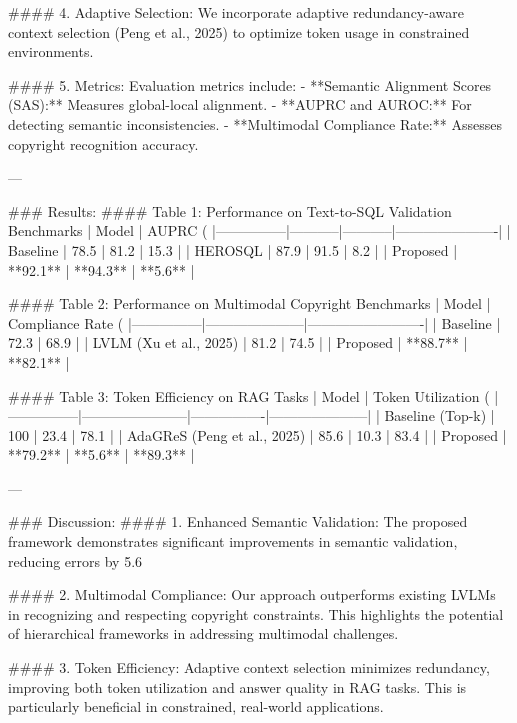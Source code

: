 #### 4. Adaptive Selection:
We incorporate adaptive redundancy-aware context selection (Peng et al., 2025) to optimize token usage in constrained environments.

#### 5. Metrics:
Evaluation metrics include:
- **Semantic Alignment Scores (SAS):** Measures global-local alignment.
- **AUPRC and AUROC:** For detecting semantic inconsistencies.
- **Multimodal Compliance Rate:** Assesses copyright recognition accuracy.

---

### Results:
#### Table 1: Performance on Text-to-SQL Validation Benchmarks
| Model         | AUPRC (%
|---------------|-----------|-----------|----------------------|
| Baseline      | 78.5      | 81.2      | 15.3                 |
| HEROSQL       | 87.9      | 91.5      | 8.2                  |
| Proposed      | **92.1**  | **94.3**  | **5.6**              |

#### Table 2: Performance on Multimodal Copyright Benchmarks
| Model         | Compliance Rate (%
|---------------|---------------------|-------------------------|
| Baseline      | 72.3                | 68.9                    |
| LVLM (Xu et al., 2025) | 81.2        | 74.5                    |
| Proposed      | **88.7**            | **82.1**                |

#### Table 3: Token Efficiency on RAG Tasks
| Model         | Token Utilization (%
|---------------|-----------------------|----------------|---------------------|
| Baseline (Top-k) | 100                | 23.4           | 78.1                |
| AdaGReS (Peng et al., 2025) | 85.6   | 10.3           | 83.4                |
| Proposed      | **79.2**             | **5.6**        | **89.3**            |

---

### Discussion:
#### 1. Enhanced Semantic Validation:
The proposed framework demonstrates significant improvements in semantic validation, reducing errors by 5.6%

#### 2. Multimodal Compliance:
Our approach outperforms existing LVLMs in recognizing and respecting copyright constraints. This highlights the potential of hierarchical frameworks in addressing multimodal challenges.

#### 3. Token Efficiency:
Adaptive context selection minimizes redundancy, improving both token utilization and answer quality in RAG tasks. This is particularly beneficial in constrained, real-world applications.

